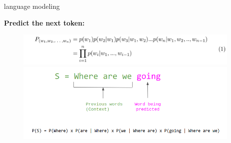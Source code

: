\begin{vbframe}{language modeling}
	
\vfill

\textbf{Predict the next token:}

\begin{figure}
	\centering
		\includegraphics[width = 11cm]{figure/language-modeling.png}\\ 
		\includegraphics[width = 11cm]{figure/language-modeling2.png}\\
\end{figure}

\vfill

\end{vbframe}


